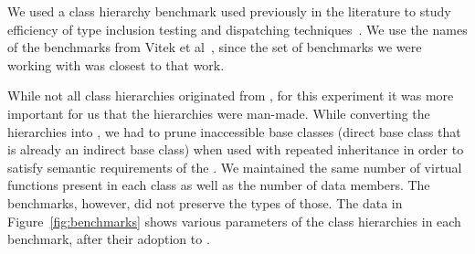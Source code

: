 We used a class hierarchy benchmark used previously in the literature to study efficiency of type 
inclusion testing and dispatching techniques~\cite{Vitek97,Krall97nearoptimal,PQEncoding,Ducournau08}. 
We use the names of the benchmarks from Vitek et al~\cite[Table 2]{Vitek97}, 
since the set of benchmarks we were working with was closest to that work.

While not all class hierarchies originated from \Cpp{}, for this experiment it 
was more important for us that the hierarchies were man-made. While converting 
the hierarchies into \Cpp{}, we had to prune inaccessible base classes (direct base  
class that is already an indirect base class) when used with repeated 
inheritance in order to satisfy semantic requirements of the \Cpp{}. We maintained 
the same number of virtual functions present in each class as well as the number 
of data members. The benchmarks, however, did not preserve the types of those.
The data in Figure~\ref{fig:benchmarks} shows various parameters of the class 
hierarchies in each benchmark, after their adoption to \Cpp{}. 

